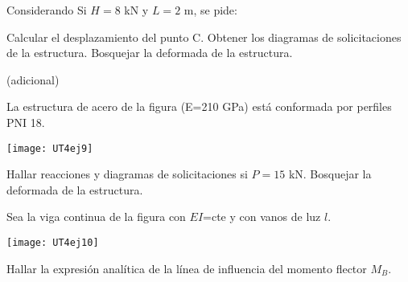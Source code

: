 Considerando Si $H=8$ kN y $L=2$ m, se pide:

\parte Calcular el desplazamiento del punto C.
\parte Obtener los diagramas de solicitaciones de la estructura.
\parte Bosquejar la deformada de la estructura.

\ejercicio (adicional) 

La estructura de acero de la figura (E=210 GPa) está conformada por perfiles PNI 18. 

\begin{center}
	\texttt{[image: UT4ej9]}
\end{center}

\parte Hallar reacciones y diagramas de solicitaciones si $P=15$ kN. 
\parte Bosquejar la deformada de la estructura.

\ejercicio

Sea la viga continua de la figura con $EI$=cte y con vanos de luz $l$.

\begin{center}
	\texttt{[image: UT4ej10]}
\end{center}

\parte Hallar la expresión analítica de la línea de influencia del momento flector $M_B$.


